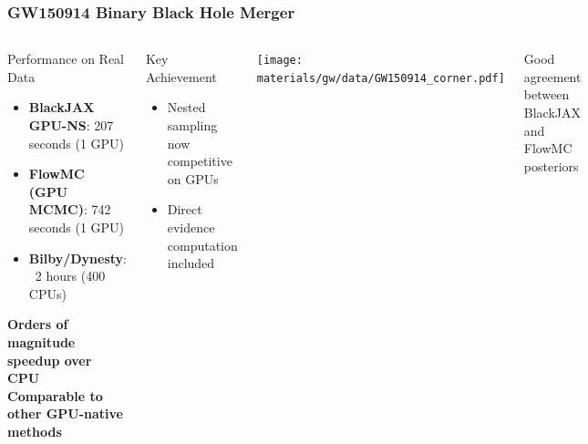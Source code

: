 \documentclass[aspectratio=169]{beamer}
\begin{document}
\begin{frame}
    \frametitle{GW150914 Binary Black Hole Merger}
    \begin{columns}
        \begin{block}{Performance on Real Data}
            \begin{itemize}
                \item \textbf{BlackJAX GPU-NS}: 207 seconds (1 GPU)
                \item \textbf{FlowMC (GPU MCMC)}: 742 seconds (1 GPU)
                \item \textbf{Bilby/Dynesty}: ~2 hours (400 CPUs)
            \end{itemize}
            \begin{center}
                \textbf{Orders of magnitude speedup over CPU}\\
                \textbf{Comparable to other GPU-native methods}
            \end{center}
            \vspace{5pt}
        \end{block}
        \begin{block}{Key Achievement}
            \begin{itemize}
                \item Nested sampling now competitive on GPUs
                \item Direct evidence computation included
            \end{itemize}
        \end{block}
        \texttt{[image: materials/gw/data/GW150914\_corner.pdf]}
        \vspace{5pt}
        \begin{center}
            \small{Good agreement between BlackJAX\\and FlowMC posteriors}
        \end{center}
    \end{columns}
\end{frame}
\end{document}
